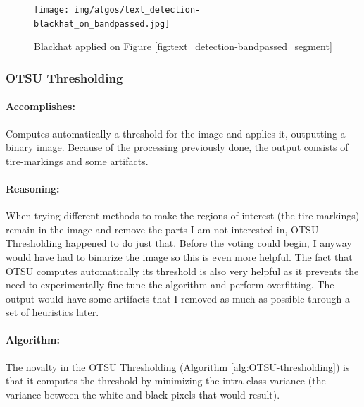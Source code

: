 \begin{figure}
    \centering
    \texttt{[image: img/algos/text\_detection-blackhat\_on\_bandpassed.jpg]}
    \caption{Blackhat applied on Figure \ref{fig:text_detection-bandpassed_segment}}
    \label{fig:text_detection-blackhat_on_bandpassed_segment}
\end{figure}

\subsubsection{OTSU Thresholding}
\label{subsubsec:OTSU-binarization}

\paragraph*{Accomplishes:}\mbox{}\par
Computes automatically a threshold for the image and applies it, outputting a binary image. Because of the processing previously done, the output consists of tire-markings and some artifacts.

\paragraph*{Reasoning:}\mbox{}\par
When trying different methods to make the regions of interest (the tire-markings) remain in the image and remove the parts I am not interested in, OTSU Thresholding happened to do just that. Before the voting could begin, I anyway would have had to binarize the image so this is even more helpful. The fact that OTSU computes automatically its threshold is also very helpful as it prevents the need to experimentally fine tune the algorithm and perform overfitting. The output would have some artifacts that I removed as much as possible through a set of heuristics later.

\paragraph*{Algorithm:}\mbox{}\par
The novalty in the OTSU Thresholding (Algorithm \ref{alg:OTSU-thresholding}) is that it computes the threshold by minimizing the intra-class variance (the variance between the white and black pixels that would result).

